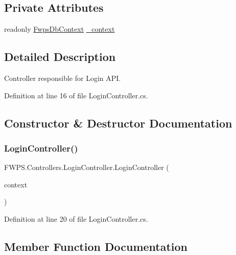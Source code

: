 \subsection*{Private Attributes}
\begin{DoxyCompactItemize}
\item 
readonly \mbox{\hyperlink{class_f_w_p_s_1_1_data_1_1_fwps_db_context}{Fwps\+Db\+Context}} \mbox{\hyperlink{class_f_w_p_s_1_1_controllers_1_1_login_controller_a9acbf5235323be9f01a3411a40a34725}{\+\_\+context}}
\end{DoxyCompactItemize}


\subsection{Detailed Description}
Controller responsible for Login A\+PI. 

Definition at line 16 of file Login\+Controller.\+cs.



\subsection{Constructor \& Destructor Documentation}
\mbox{\label{class_f_w_p_s_1_1_controllers_1_1_login_controller_aad78f00742e686dc138c6fd0ddd55adb}} 
\subsubsection{\texorpdfstring{Login\+Controller()}{LoginController()}}
{\footnotesize\ttfamily F\+W\+P\+S.\+Controllers.\+Login\+Controller.\+Login\+Controller (\begin{DoxyParamCaption}\item[{\mbox{\hyperlink{class_f_w_p_s_1_1_data_1_1_fwps_db_context}{Fwps\+Db\+Context}}}]{context }\end{DoxyParamCaption})}



Definition at line 20 of file Login\+Controller.\+cs.



\subsection{Member Function Documentation}
\mbox{\label{class_f_w_p_s_1_1_controllers_1_1_login_controller_a80569095f4a0d5bf8e68c45a192307cc}} 
